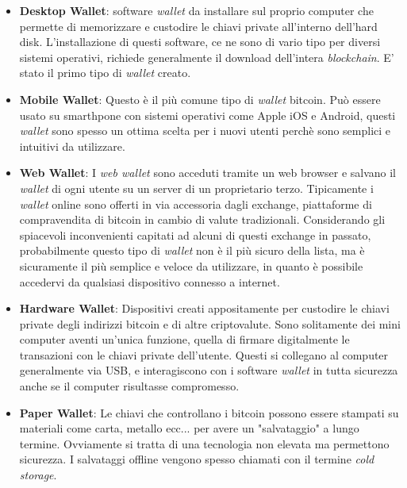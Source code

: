 \begin{itemize}
\item \textbf{Desktop Wallet}:  software \textit{wallet} da installare sul proprio computer che permette di memorizzare e custodire le chiavi private all'interno dell'hard disk. L'installazione di questi software, ce ne sono di vario tipo per diversi sistemi operativi, richiede generalmente il download dell'intera \textit{blockchain}. E' stato il primo tipo di \textit{wallet} creato.

\item \textbf{Mobile Wallet}: Questo \`e il pi\`u comune tipo di \textit{wallet} bitcoin. Pu\`o essere usato su smarthpone con sistemi operativi come Apple iOS e Android, questi 	\textit{wallet} sono spesso un ottima scelta per i nuovi utenti perch\`e sono semplici e intuitivi da utilizzare.

\item \textbf{Web Wallet}: I \textit{web wallet} sono acceduti tramite un web browser e salvano il \textit{wallet} di ogni utente su un server di un proprietario terzo.  Tipicamente i \textit{wallet} online sono offerti in via accessoria dagli exchange, piattaforme di compravendita di bitcoin in cambio di valute tradizionali. Considerando gli spiacevoli inconvenienti capitati ad alcuni di questi exchange in passato, probabilmente questo tipo di \textit{wallet} non \`e il pi\`u sicuro della lista, ma \`e sicuramente il pi\`u semplice e veloce da utilizzare, in quanto \`e possibile accedervi da qualsiasi dispositivo connesso a internet. 

\item \textbf{Hardware Wallet}:  Dispositivi creati appositamente per custodire le chiavi private degli indirizzi bitcoin e di altre criptovalute. Sono solitamente dei mini computer aventi un'unica funzione, quella di firmare digitalmente le transazioni con le chiavi private dell'utente. Questi si collegano al computer generalmente via
USB, e interagiscono con i software \textit{wallet} in tutta sicurezza anche se il computer risultasse compromesso. 

\item \textbf{Paper Wallet}: Le chiavi che controllano i bitcoin possono essere stampati su materiali come carta, metallo ecc... per avere un "salvataggio" a lungo termine. Ovviamente si tratta di una tecnologia non elevata ma permettono sicurezza. I salvataggi offline vengono spesso chiamati con il termine \textit{cold storage}.



\end{itemize}

